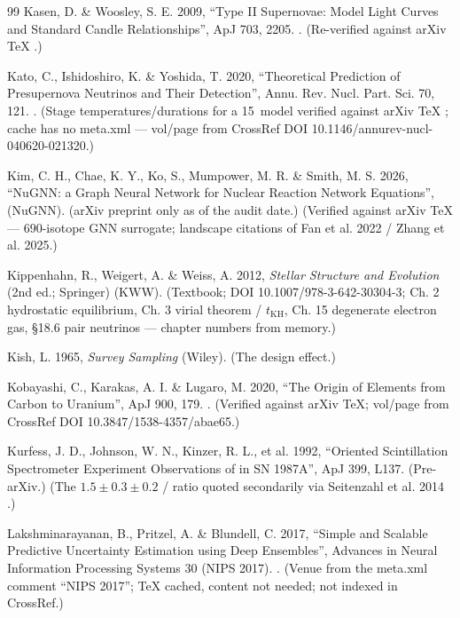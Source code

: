 \begin{thebibliography}{99}
Kasen, D. \& Woosley, S. E. 2009, ``Type II Supernovae: Model Light Curves and Standard Candle Relationships'', ApJ 703, 2205. . (Re-verified against arXiv TeX .)

Kato, C., Ishidoshiro, K. \& Yoshida, T. 2020, ``Theoretical Prediction of Presupernova Neutrinos and Their Detection'', Annu. Rev. Nucl. Part. Sci. 70, 121. . (Stage temperatures/durations for a 15\,\Msun{} model verified against arXiv TeX ; cache has no meta.xml --- vol/page from CrossRef DOI 10.1146/annurev-nucl-040620-021320.)

Kim, C. H., Chae, K. Y., Ko, S., Mumpower, M. R. \& Smith, M. S. 2026, ``NuGNN: a Graph Neural Network for Nuclear Reaction Network Equations'',  (NuGNN). (arXiv preprint only as of the audit date.) (Verified against arXiv TeX  --- 690-isotope GNN surrogate; landscape citations of Fan et al. 2022 / Zhang et al. 2025.)

Kippenhahn, R., Weigert, A. \& Weiss, A. 2012, \emph{Stellar Structure and Evolution} (2nd ed.; Springer) (KWW). (Textbook; DOI 10.1007/978-3-642-30304-3; Ch. 2 hydrostatic equilibrium, Ch. 3 virial theorem / $t_{\mathrm{KH}}$, Ch. 15 degenerate electron gas, \S 18.6 pair neutrinos --- chapter numbers from memory.)

Kish, L. 1965, \emph{Survey Sampling} (Wiley). (The design effect.)

Kobayashi, C., Karakas, A. I. \& Lugaro, M. 2020, ``The Origin of Elements from Carbon to Uranium'', ApJ 900, 179. . (Verified against arXiv TeX; vol/page from CrossRef DOI 10.3847/1538-4357/abae65.)

Kurfess, J. D., Johnson, W. N., Kinzer, R. L., et al. 1992, ``Oriented Scintillation Spectrometer Experiment Observations of  in SN 1987A'', ApJ 399, L137. (Pre-arXiv.) (The $1.5 \pm 0.3 \pm 0.2$ / ratio quoted secondarily via Seitenzahl et al. 2014 .)

Lakshminarayanan, B., Pritzel, A. \& Blundell, C. 2017, ``Simple and Scalable Predictive Uncertainty Estimation using Deep Ensembles'', Advances in Neural Information Processing Systems 30 (NIPS 2017). . (Venue from the meta.xml comment ``NIPS 2017''; TeX cached, content not needed; not indexed in CrossRef.)


\end{thebibliography}
